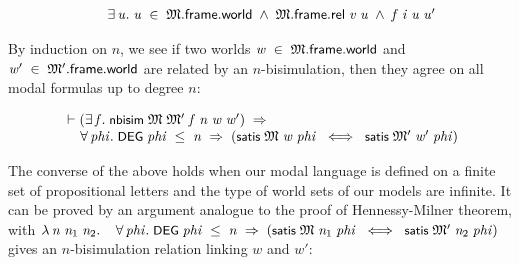 \documentclass[letterpaper]{article}
\renewcommand{\HOLConst}[1]{{\textsf{\upshape\small #1}}}
\renewcommand{\HOLinline}[1]{\ensuremath{#1}}
\newenvironment{holmath}{\begin{displaymath}\begin{array}{l}}{\end{array}\end{displaymath}\ignorespacesafterend}
\begin{document}
\begin{holmath}
\;\;\;\;\;\;\HOLSymConst{\HOLTokenExists{}}\HOLBoundVar{u}.\;\HOLBoundVar{u}\;\HOLSymConst{\HOLTokenIn{}}\;\HOLFreeVar{\ensuremath{\mathfrak{M}}}.\HOLFieldName{frame}.\HOLFieldName{world}\;\HOLSymConst{\HOLTokenConj{}}\;\HOLFreeVar{\ensuremath{\mathfrak{M}}}.\HOLFieldName{frame}.\HOLFieldName{rel}\;\HOLBoundVar{v}\;\HOLBoundVar{u}\;\HOLSymConst{\HOLTokenConj{}}\;\HOLFreeVar{f}\;\HOLBoundVar{i}\;\HOLBoundVar{u}\;\HOLBoundVar{u\sp{\prime}}
\end{holmath} 


By induction on $n$, we see if two worlds \HOLinline{\HOLFreeVar{w}\;\HOLSymConst{\HOLTokenIn{}}\;\HOLFreeVar{\ensuremath{\mathfrak{M}}}.\HOLFieldName{frame}.\HOLFieldName{world}} and \HOLinline{\HOLFreeVar{w\sp{\prime}}\;\HOLSymConst{\HOLTokenIn{}}\;\HOLFreeVar{\ensuremath{\mathfrak{M}'}}.\HOLFieldName{frame}.\HOLFieldName{world}} are related by an $n$-bisimulation, then they agree on all modal formulas up to degree $n$:

\begin{holmath}
  \ensuremath{\HOLTokenTurnstile}(\HOLSymConst{\HOLTokenExists{}}\HOLBoundVar{f}.\;\HOLConst{nbisim}\;\HOLFreeVar{\ensuremath{\mathfrak{M}}}\;\HOLFreeVar{\ensuremath{\mathfrak{M}'}}\;\HOLBoundVar{f}\;\HOLFreeVar{n}\;\HOLFreeVar{w}\;\HOLFreeVar{w\sp{\prime}})\;\HOLSymConst{\HOLTokenImp{}}\\
\;\;\;\;\;\HOLSymConst{\HOLTokenForall{}}\HOLBoundVar{phi}.\;\HOLConst{DEG}\;\HOLBoundVar{phi}\;\HOLSymConst{\HOLTokenLeq{}}\;\HOLFreeVar{n}\;\HOLSymConst{\HOLTokenImp{}}\;(\HOLConst{satis}\;\HOLFreeVar{\ensuremath{\mathfrak{M}}}\;\HOLFreeVar{w}\;\HOLBoundVar{phi}\;\HOLSymConst{\HOLTokenEquiv{}}\;\HOLConst{satis}\;\HOLFreeVar{\ensuremath{\mathfrak{M}'}}\;\HOLFreeVar{w\sp{\prime}}\;\HOLBoundVar{phi})
\end{holmath}

The converse of the above holds when our modal language is defined on a finite set of propositional letters and the type of world sets of our models are infinite. It can be proved by an argument analogue to the proof of Hennessy-Milner theorem, with \HOLinline{\HOLTokenLambda{}\HOLBoundVar{n}\;\HOLBoundVar{n\sb{\mathrm{1}}}\;\HOLBoundVar{n\sb{\mathrm{2}}}.\\
\;\;\;\;\HOLSymConst{\HOLTokenForall{}}\HOLBoundVar{phi}.\;\HOLConst{DEG}\;\HOLBoundVar{phi}\;\HOLSymConst{\HOLTokenLeq{}}\;\HOLBoundVar{n}\;\HOLSymConst{\HOLTokenImp{}}\;(\HOLConst{satis}\;\HOLFreeVar{\ensuremath{\mathfrak{M}}}\;\HOLBoundVar{n\sb{\mathrm{1}}}\;\HOLBoundVar{phi}\;\HOLSymConst{\HOLTokenEquiv{}}\;\HOLConst{satis}\;\HOLFreeVar{\ensuremath{\mathfrak{M}'}}\;\HOLBoundVar{n\sb{\mathrm{2}}}\;\HOLBoundVar{phi})} gives an $n$-bisimulation relation linking $w$ and $w'$:
\end{document}
